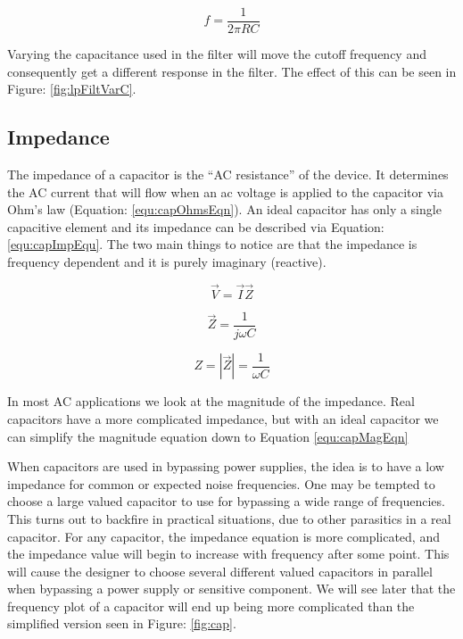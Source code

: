 \begin{equation}
\label{equ:lpfilter_eqn}
f = \frac{1}{2\pi RC}
\end{equation}

Varying the capacitance used in the filter will move the cutoff frequency and consequently get a different response in the filter. The effect of this can be seen in Figure: \ref{fig:lpFiltVarC}.



\subsection{Impedance}

The impedance of a capacitor is the ``AC resistance'' of the device. It determines the AC current that will flow when an ac voltage is applied to the capacitor via Ohm's law (Equation: \eqref{equ:capOhmsEqn}). An ideal capacitor has only a single capacitive element and its impedance can be described via Equation: \eqref{equ:capImpEqu}. The two main things to notice are that the impedance is frequency dependent and it is purely imaginary (reactive).

\begin{equation}
\label{equ:capOhmsEqn}
\vec{V} = \vec{I} \vec{Z}
\end{equation}

\begin{equation}
\label{equ:capImpEqu}
\vec{Z} = \frac{1}{j\omega C}
\end{equation}

\begin{equation}
\label{equ:capMagEqn}
Z = |\vec{Z}| = \frac{1}{\omega C}
\end{equation}

In most AC applications we look at the magnitude of the impedance. Real capacitors have a more complicated impedance, but with an ideal capacitor we can simplify the magnitude equation down to Equation \eqref{equ:capMagEqn}

When capacitors are used in bypassing power supplies, the idea is to have a low impedance for common or expected noise frequencies. One may be tempted to choose a large valued capacitor to use for bypassing a wide range of frequencies. This turns out to backfire in practical situations, due to other parasitics in a real capacitor. For any capacitor, the impedance equation is more complicated, and the impedance value will begin to increase with frequency after some point. This will cause the designer to choose several different valued capacitors in parallel when bypassing a power supply or sensitive component. We will see later that the frequency plot of a capacitor will end up being more complicated than the simplified version seen in Figure: \ref{fig:cap}.

